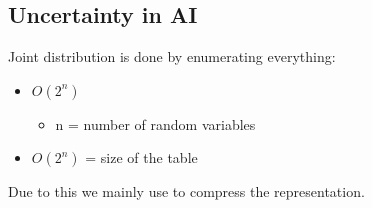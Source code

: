 \documentclass[
../EiKI_Summary.tex,
]
{subfiles}
\begin{document}
\subsection{Uncertainty in AI}
Joint distribution is done by enumerating everything:
\begin{itemize}
    \item {} $O(2^n)$
    \begin{itemize}
        \item n = number of random variables
    \end{itemize}
    \item {} $O(2^n)$ = size of the table
\end{itemize}

Due to this we mainly use  to compress the representation.
\end{document}
